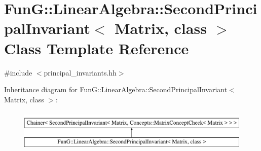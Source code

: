 \hypertarget{classFunG_1_1LinearAlgebra_1_1SecondPrincipalInvariant}{\section{Fun\-G\-:\-:Linear\-Algebra\-:\-:Second\-Principal\-Invariant$<$ Matrix, class $>$ Class Template Reference}
\label{classFunG_1_1LinearAlgebra_1_1SecondPrincipalInvariant}
}


{\ttfamily \#include $<$principal\-\_\-invariants.\-hh$>$}

Inheritance diagram for Fun\-G\-:\-:Linear\-Algebra\-:\-:Second\-Principal\-Invariant$<$ Matrix, class $>$\-:\begin{figure}[H]
\begin{center}
\leavevmode
\includegraphics[height=2.000000cm]{classFunG_1_1LinearAlgebra_1_1SecondPrincipalInvariant}
\end{center}
\end{figure}
